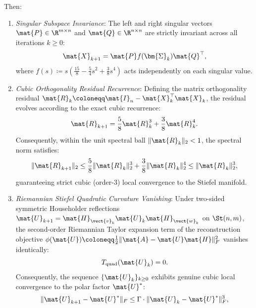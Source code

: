 \begin{theorem}
Then:
\begin{enumerate}
    \item \emph{Singular Subspace Invariance}:
    The left and right singular vectors $\mat{P} \in \R^{m \times n}$ and $\mat{Q} \in \R^{n \times n}$ are strictly invariant across all iterations $k \ge 0$:
    \begin{equation}
    \mat{X}_{k+1} = \mat{P} f(\bm{\Sigma}_k) \mat{Q}^\top,
    \label{eq:subspace_invariance}
    \end{equation}
    where $f(s) \coloneqq s \left( \frac{15}{8} - \frac{5}{4} s^2 + \frac{3}{8} s^4 \right)$ acts independently on each singular value.
    \item \emph{Cubic Orthogonality Residual Recurrence}:
    Defining the matrix orthogonality residual $\mat{R}_k \coloneqq \mat{I}_n - \mat{X}_k^\top \mat{X}_k$, the residual evolves according to the exact cubic recurrence:
    \begin{equation}
    \mat{R}_{k+1} = \frac{5}{8} \mat{R}_k^3 + \frac{3}{8} \mat{R}_k^4.
    \label{eq:matrix_cubic_residual_map}
    \end{equation}
    Consequently, within the unit spectral ball $\|\mat{R}_k\|_2 < 1$, the spectral norm satisfies:
    \begin{equation}
    \|\mat{R}_{k+1}\|_2 \le \frac{5}{8} \|\mat{R}_k\|_2^3 + \frac{3}{8} \|\mat{R}_k\|_2^4 \le \|\mat{R}_k\|_2^3,
    \label{eq:matrix_cubic_norm_bound}
    \end{equation}
    guaranteeing strict cubic (order-3) local convergence to the Stiefel manifold.
    \item \emph{Riemannian Stiefel Quadratic Curvature Vanishing}:
    Under two-sided symmetric Householder reflections $\mat{U}_{k+1} = \mat{H}_{\vect{v}_k} \mat{U}_k \mat{H}_{\vect{w}_k}$ on $\St(n, m)$, the second-order Riemannian Taylor expansion term of the reconstruction objective $\phi(\mat{U}) \coloneqq \frac{1}{2}\|\mat{A} - \mat{U}\mat{H}\|_F^2$ vanishes identically:
    \begin{equation}
    T_{\text{quad}}(\mat{U}_k) = 0.
    \label{eq:quadratic_tensor_vanishing}
    \end{equation}
    Consequently, the sequence $\{\mat{U}_k\}_{k \ge 0}$ exhibits genuine cubic local convergence to the polar factor $\mat{U}^*$:
    \begin{equation}
    \|\mat{U}_{k+1} - \mat{U}^*\|_F \le \Gamma \cdot \|\mat{U}_k - \mat{U}^*\|_F^3,
    \label{eq:cubic_convergence_stiefel}
    \end{equation}

\end{enumerate}
\end{theorem}
